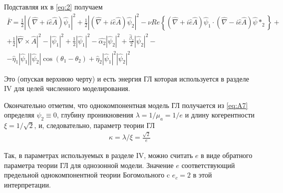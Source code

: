 Подставляя их в \eqref{eq:2} получаем
\begin{align*}
	\bar{F} = \frac{1}{2}\left| 
		\left( \hat{\nabla} + i\hat{e}\hat{A} \right)\hat{\psi}_1 \right|^2 + 
		\frac{1}{2}\left| 
		\left( \hat{\nabla} + i\hat{e}\hat{A} \right)\hat{\psi}_2 \right|^2 -
		\nu Re\left\{ \left( \hat{\nabla} + i\hat{e}\hat{A} \right)
		\hat{\psi}_1 \cdot \left( \hat{\nabla} - i\hat{e}\hat{A} \right)
		\hat{\psi}*_2 \right\} + \\
		+ \frac{1}{2}\left| \hat{\nabla}\times\hat{A} \right|^2 - 
		\left|\hat{\psi}_1\right|^2 + 
		\frac{1}{2}\left|\hat{\psi}_1 \right|^2 - 
		\hat{\alpha_2}\left| \hat{\psi}_2 \right|^2 + 
		\frac{\hat{\beta}_2}{2}\left| \hat{\psi}_2 \right|^2 - \\
		- \hat{\eta}_1\left|\hat{\psi}_1\right|\left|\hat{\psi}_2\right|
		\cos(\theta_1 - \theta_2) + \hat{\eta}_2\left|\hat{\psi}_1\right|^2 
		\left|\hat{\psi}_2\right|^2
\end{align*} %

Это (опуская верхнюю черту) и есть энергия ГЛ которая 
используется в разделе IV для целей численного моделирования. 

Окончательно отметим, что однокомпонентная модель ГЛ получается 
из \eqref{eq:A7} определяя \( \psi_2 \equiv 0 \), глубину проникновения 
\( \lambda = 1/\mu_a = 1/e \) и длину когерентности 
\( \xi = 1/\sqrt{2} \), и, следовательно, параметр теории ГЛ
\begin{align*}
	\kappa = \lambda/\xi = \frac{\sqrt{2}}{e}
\end{align*} %

Так, в параметрах используемых в разделе IV, можно считать \( e \) в виде 
обратного параметра теории ГЛ для однозонной модели. Значение \( e \) 
соответствующий предельной однокомпонентной теории Богомольного c 
\( e_c = 2 \) в этой интерпретации.
